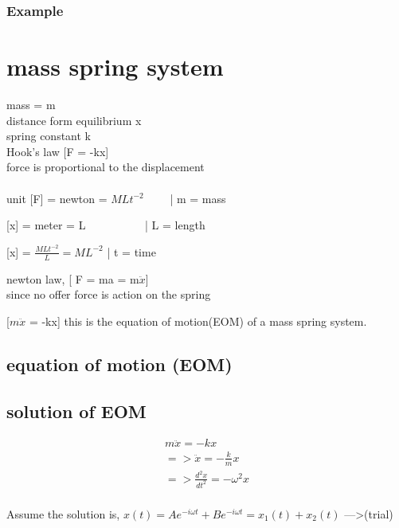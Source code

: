 	
	
		
\subsubsection{Example}






\section{mass spring system}

	mass = m \\
	distance form equilibrium x \\
	spring constant k \\
	Hook's law [F = -kx] \\
	force is proportional to the displacement \\
	\\
	unit 
	[F] = newton = $MLt^{-2}$ \ \ \ \ | m = mass 
	
	[x] = meter  = L \ \ \ \ \ \ \ \ \ \ | L = length 
	
	[x] = $\frac{MLt^{-2}}{L} = ML^{-2} $ | t = time
	
	newton law, [ F = ma = m$\ddot{x}$]\\
	since no offer force is action on the spring
	
	[$m\ddot{x}$ = -kx] this is the equation of motion(EOM) of a mass spring system.\\
	
	



\subsection{equation of motion (EOM)}
	


\subsection{solution of EOM}

	\begin{align}
		m\ddot{x} = -kx \\
		=> \ddot{x} = -\frac{k}{m}x \\
		=>\frac{d^2x}{dt^2} = -\omega^2 x\\
	\end{align}
	
	Assume the solution is, $x(t) = Ae^{-i\omega t}+Be^{-i\omega t} = x_1(t)+x_2(t)$ --->(trial) \\
	
